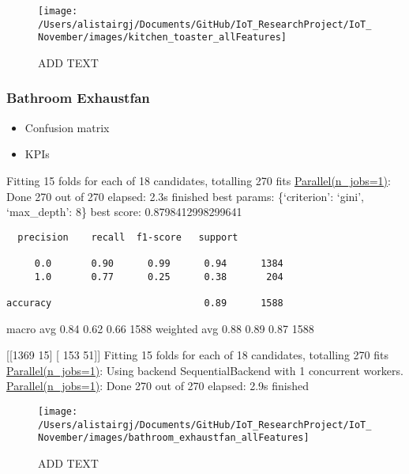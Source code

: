 \documentclass[11pt,]{article}
\providecommand{\tightlist}{%
  \setlength{\itemsep}{0pt}\setlength{\parskip}{0pt}}
\begin{document}
\begin{figure}[H]

{\centering \texttt{[image: /Users/alistairgj/Documents/GitHub/IoT\_ResearchProject/IoT\_November/images/kitchen\_toaster\_allFeatures]} 

}

\caption{ADD TEXT}\label{fig:unnamed-chunk-4}
\end{figure}

\pagebreak

\hypertarget{bathroom-exhaustfan}{%
\subsubsection{Bathroom Exhaustfan}\label{bathroom-exhaustfan}}

\begin{itemize}
\tightlist
\item
  Confusion matrix
\item
  KPIs
\end{itemize}

Fitting 15 folds for each of 18 candidates, totalling 270 fits
\href{Done\%20270\%20out\%20of\%20270\%20\%7C\%20elapsed:\%202.1s\%20finished}{Parallel(n\_jobs=1)}:
Done 270 out of 270 \textbar{} elapsed: 2.3s finished best params:
\{`criterion': `gini', `max\_depth': 8\} best score: 0.8798412998299641

\begin{verbatim}
  precision    recall  f1-score   support

     0.0       0.90      0.99      0.94      1384
     1.0       0.77      0.25      0.38       204

accuracy                           0.89      1588
\end{verbatim}

macro avg 0.84 0.62 0.66 1588 weighted avg 0.88 0.89 0.87 1588

{[}{[}1369 15{]} {[} 153 51{]}{]} Fitting 15 folds for each of 18
candidates, totalling 270 fits
\href{Done\%20270\%20out\%20of\%20270\%20\%7C\%20elapsed:\%202.1s\%20finished}{Parallel(n\_jobs=1)}:
Using backend SequentialBackend with 1 concurrent workers.
\href{Done\%20270\%20out\%20of\%20270\%20\%7C\%20elapsed:\%202.1s\%20finished}{Parallel(n\_jobs=1)}:
Done 270 out of 270 \textbar{} elapsed: 2.9s finished

\begin{figure}[H]

{\centering \texttt{[image: /Users/alistairgj/Documents/GitHub/IoT\_ResearchProject/IoT\_November/images/bathroom\_exhaustfan\_allFeatures]} 

}

\caption{ADD TEXT}\label{fig:unnamed-chunk-5}
\end{figure}
\end{document}
